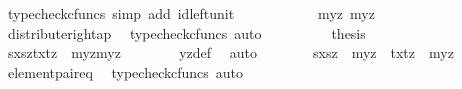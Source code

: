 \begin{isabellebody}
\ {\isacharparenleft}{\kern0pt}typecheck{\isacharunderscore}{\kern0pt}cfuncs{\isacharcomma}{\kern0pt}\ simp\ add{\isacharcolon}{\kern0pt}\ id{\isacharunderscore}{\kern0pt}left{\isacharunderscore}{\kern0pt}unit{}{\isacharparenright}{\kern0pt}\isanewline
\ \ \ \ \ \ \isamarkupfalse%
\ \isamarkupfalse%
\ {\isachardoublequoteopen}{\isachardot}{\kern0pt}{\isachardot}{\kern0pt}{\isachardot}{\kern0pt}\ {\isacharequal}{\kern0pt}\ {\isasymlangle}{\isasymlangle}my{}{\isacharcomma}{\kern0pt}z{\isasymrangle}{\isacharcomma}{\kern0pt}\ {\isasymlangle}my{}{\isacharcomma}{\kern0pt}z{\isasymrangle}{\isasymrangle}{\isachardoublequoteclose}\isanewline
\ \ \ \ \ \ \ \ \isamarkupfalse%
\ distribute{\isacharunderscore}{\kern0pt}right{\isacharunderscore}{\kern0pt}ap\ \isamarkupfalse%
\ {\isacharparenleft}{\kern0pt}typecheck{\isacharunderscore}{\kern0pt}cfuncs{\isacharcomma}{\kern0pt}\ auto{\isacharparenright}{\kern0pt}\isanewline
\ \ \ \ \ \ \isamarkupfalse%
\ \isamarkupfalse%
\ {\isacharquery}{\kern0pt}thesis\isacommand{{\isachardot}{\kern0pt}}\isamarkupfalse%
\isanewline
\ \ \ \ \isamarkupfalse%
\ \ \ \isanewline
\ \ \ \ \isamarkupfalse%
\ \isamarkupfalse%
\ {\isachardoublequoteopen}{\isasymlangle}{\isasymlangle}sx{\isacharcomma}{\kern0pt}sz{\isasymrangle}{\isacharcomma}{\kern0pt}{\isasymlangle}tx{\isacharcomma}{\kern0pt}tz{\isasymrangle}{\isasymrangle}\ {\isacharequal}{\kern0pt}\ {\isasymlangle}{\isasymlangle}my{}{\isacharcomma}{\kern0pt}z{\isasymrangle}{\isacharcomma}{\kern0pt}{\isasymlangle}my{}{\isacharcomma}{\kern0pt}z{\isasymrangle}{\isasymrangle}{\isachardoublequoteclose}\isanewline
\ \ \ \ \ \ \isamarkupfalse%
\ yz{\isacharunderscore}{\kern0pt}def\ \isamarkupfalse%
\ auto\isanewline
\ \ \ \ \isamarkupfalse%
\ \isamarkupfalse%
\ {\isachardoublequoteopen}{\isasymlangle}sx{\isacharcomma}{\kern0pt}sz{\isasymrangle}\ {\isacharequal}{\kern0pt}\ {\isasymlangle}my{}{\isacharcomma}{\kern0pt}z{\isasymrangle}\ {\isasymand}\ {\isasymlangle}tx{\isacharcomma}{\kern0pt}tz{\isasymrangle}\ {\isacharequal}{\kern0pt}\ {\isasymlangle}my{}{\isacharcomma}{\kern0pt}z{\isasymrangle}{\isachardoublequoteclose}\isanewline
\ \ \ \ \ \ \isamarkupfalse%
\ element{\isacharunderscore}{\kern0pt}pair{\isacharunderscore}{\kern0pt}eq\ \isamarkupfalse%
\ {\isacharparenleft}{\kern0pt}typecheck{\isacharunderscore}{\kern0pt}cfuncs{\isacharcomma}{\kern0pt}\ auto{\isacharparenright}{\kern0pt}\isanewline

\end{isabellebody}
